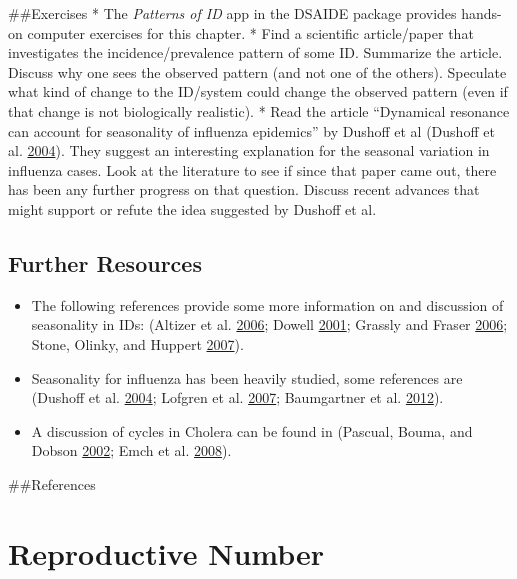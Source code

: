 \documentclass[]{book}
\providecommand{\tightlist}{%
  \setlength{\itemsep}{0pt}\setlength{\parskip}{0pt}}
\theoremstyle{definition}
\theoremstyle{definition}
\theoremstyle{definition}
\theoremstyle{remark}
\begin{document}
\#\#Exercises * The \emph{Patterns of ID} app in the DSAIDE package
provides hands-on computer exercises for this chapter. * Find a
scientific article/paper that investigates the incidence/prevalence
pattern of some ID. Summarize the article. Discuss why one sees the
observed pattern (and not one of the others). Speculate what kind of
change to the ID/system could change the observed pattern (even if that
change is not biologically realistic). * Read the article ``Dynamical
resonance can account for seasonality of influenza epidemics'' by
Dushoff et al (Dushoff et al. \protect\hyperlink{ref-dushoff04}{2004}).
They suggest an interesting explanation for the seasonal variation in
influenza cases. Look at the literature to see if since that paper came
out, there has been any further progress on that question. Discuss
recent advances that might support or refute the idea suggested by
Dushoff et al.

\hypertarget{further-resources}{%
\section{Further Resources}\label{further-resources}}

\begin{itemize}
\tightlist
\item
  The following references provide some more information on and
  discussion of seasonality in IDs: (Altizer et al.
  \protect\hyperlink{ref-altizer06}{2006}; Dowell
  \protect\hyperlink{ref-dowell01}{2001}; Grassly and Fraser
  \protect\hyperlink{ref-grassly06}{2006}; Stone, Olinky, and Huppert
  \protect\hyperlink{ref-stone07}{2007}).
\item
  Seasonality for influenza has been heavily studied, some references
  are (Dushoff et al. \protect\hyperlink{ref-dushoff04}{2004}; Lofgren
  et al. \protect\hyperlink{ref-lofgren07}{2007}; Baumgartner et al.
  \protect\hyperlink{ref-baumgartner12}{2012}).
\item
  A discussion of cycles in Cholera can be found in (Pascual, Bouma, and
  Dobson \protect\hyperlink{ref-pascual02}{2002}; Emch et al.
  \protect\hyperlink{ref-emch08}{2008}).
\end{itemize}

\#\#References

\hypertarget{R0}{%
\chapter{Reproductive Number}\label{R0}}
\end{document}
